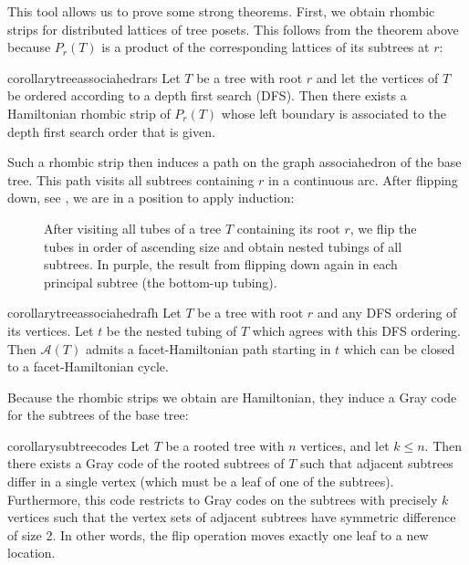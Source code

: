 \documentclass[fontsize=11pt,a4paper,DIV=12]{scrartcl}
\begin{document}
This tool allows us to prove some strong theorems. First, we obtain rhombic strips for distributed lattices of tree posets. This follows from the theorem above because $P_r(T)$ is a product of the corresponding lattices of its subtrees at $r$:

\begin{restatable}{corollary}{treeassociahedrars}\label{thm:tree associahedra rs}
    Let $T$ be a tree with root $r$ and let the vertices of $T$ be ordered according to a depth first search (DFS). Then there exists a Hamiltonian rhombic strip of $P_r(T)$ whose left boundary is associated to the depth first search order that is given.
\end{restatable}

Such a rhombic strip then induces a path on the graph associahedron of the base tree. This path visits all subtrees containing $r$ in a continuous arc. After flipping down, see , we are in a position to apply induction:

\begin{figure}
    \centering
    
    \caption{After visiting all tubes of a tree $T$ containing its root $r$, we flip the tubes in order of ascending size and obtain nested tubings of all subtrees. In purple, the result from flipping down again in each principal subtree (the bottom-up tubing).}
    \label{fig:tree flipping down}
\end{figure}

\begin{restatable}{corollary}{treeassociahedrafh}\label{thm:tree associahedra fh}
    Let $T$ be a tree with root $r$ and any DFS ordering of its vertices. Let $t$ be the nested tubing of $T$ which agrees with this DFS ordering. Then $\mathcal{A}(T)$ admits a facet-Hamiltonian path starting in $t$ which can be closed to a facet-Hamiltonian cycle.
\end{restatable}

Because the rhombic strips we obtain are Hamiltonian, they induce a Gray code for the subtrees of the base tree:

\begin{restatable}{corollary}{subtreecodes}\label{thm:subtree gray code}
   Let $T$ be a rooted tree with $n$ vertices, and let $k\le n$. Then there exists a Gray code of the rooted subtrees of $T$ such that adjacent subtrees differ in a single vertex (which must be a leaf of one of the subtrees). Furthermore, this code restricts to Gray codes on the subtrees with precisely $k$ vertices such that the vertex sets of adjacent subtrees have symmetric difference of size 2. In other words, the flip operation moves exactly one leaf to a new location.
\end{restatable}
\end{document}
